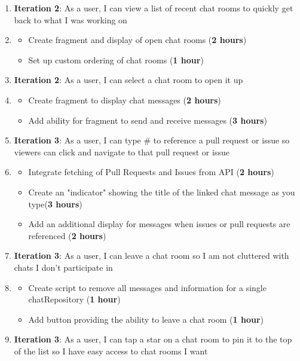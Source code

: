 \documentclass{report}
\begin{document}
\begin{enumerate}
    \item \textbf{Iteration 2}: As a user, I can view a list of recent chat rooms to quickly get back to what I was working on
    \item[] \begin{itemize}
        \item Create fragment and display of open chat rooms (\textbf{2 hours})
        \item Set up custom ordering of chat rooms (\textbf{1 hour})
    \end{itemize}
    \item \textbf{Iteration 2}: As a user, I can select a chat room to open it up
    \item[] \begin{itemize}
        \item Create fragment to display chat messages (\textbf{2 hours})
        \item Add ability for fragment to send and receive messages (\textbf{3 hours})
    \end{itemize}
    \item \textbf{Iteration 3}: As a user, I can type \# to reference a pull request or issue so viewers can click and navigate to that pull request or issue
    \item[] \begin{itemize}
        \item Integrate fetching of Pull Requests and Issues from API (\textbf{2 hours})
        \item Create an "indicator" showing the title of the linked chat message as you type(\textbf{3 hours})
        \item Add an additional display for messages when issues or pull requests are referenced (\textbf{2 hours})
    \end{itemize}
    \item \textbf{Iteration 3}: As a user, I can leave a chat room so I am not cluttered with chats I don't participate in
    \item[] \begin{itemize}
        \item Create script to remove all messages and information for a single chatRepository (\textbf{1 hour})
        \item Add button providing the ability to leave a chat room (\textbf{1 hour})
    \end{itemize}
    \item \textbf{Iteration 3}: As a user, I can tap a star on a chat room to pin it to the top of the list so I have easy access to chat rooms I want

\end{enumerate}
\end{document}
